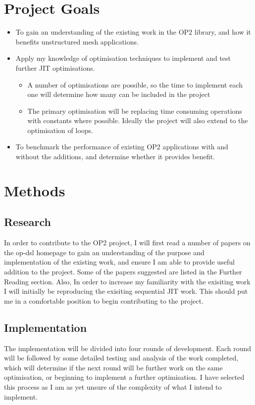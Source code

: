 \documentclass[11pt]{article}
\begin{document}
\section*{Project Goals}
 \begin{itemize}
  \item{To gain an understanding of the existing work in the OP2 library, and how it benefits unstructured mesh applications.}
  \item{Apply my knowledge of optimisation techniques to implement and test further JIT optimisations.}\
\begin{itemize}
\item{A number of optimisations are possible, so the time to implement each one will determine how many can be included in the project}
\item{The primary optimisation will be replacing time consuming operations with constants where possible. Ideally the project will also extend to the optimisation of loops.}
\end{itemize}  
\item{To benchmark the performance of existing OP2 applications with and without the additions, and determine whether it provides benefit.}
 \end{itemize}
\section*{Methods}
\subsection*{Research}
In order to contribute to the OP2 project, I will first read a number of papers on the op-dsl homepage to gain an understanding of the purpose and implementation of the existing work, and ensure I am able to provide useful addition to the project. Some of the papers suggested are listed in the Further Reading section. Also, In order to increase my familiarity with the exisiting work I will initially be reproducing the exisiting sequential JIT work. This should put me in a comfortable position to begin contributing to the project.
\subsection*{Implementation}
The implementation will be divided into four rounds of development. Each round will be followed by some detailed testing and analysis of the work completed, which will determine if the next round will be further work on the same optimisation, or beginning to implement a further optimisation. I have selected this process as I am as yet unsure of the complexity of what I intend to implement.
\end{document}
